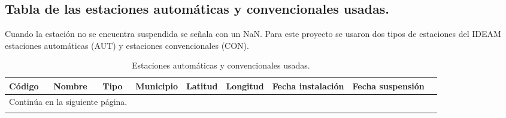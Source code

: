 
\clearpage


\begin{landscape}
\chapter{Tabla de las estaciones automáticas y convencionales usadas.}
\label{anexo:estaciones_autom_y_conv_usadas}

Cuando la estación no se encuentra suspendida se señala con un NaN. Para este proyecto se usaron dos tipos de estaciones del IDEAM estaciones automáticas (AUT) y estaciones convencionales (CON).


\newpage


\begin{longtable}{lp{4cm}lp{3cm}lrrll}
\caption{Estaciones automáticas y convencionales usadas.}
\label{tab:estaciones}\\
\toprule
 Código &                      Nombre & Tipo &              Municipio &   Latitud &   Longitud &  Fecha instalación &  Fecha suspensión \\
\midrule
\endhead
\midrule
\multicolumn{3}{r}{{Continúa en la siguiente página.}} \\
\midrule
\endfoot


\end{longtable}
\end{landscape}
